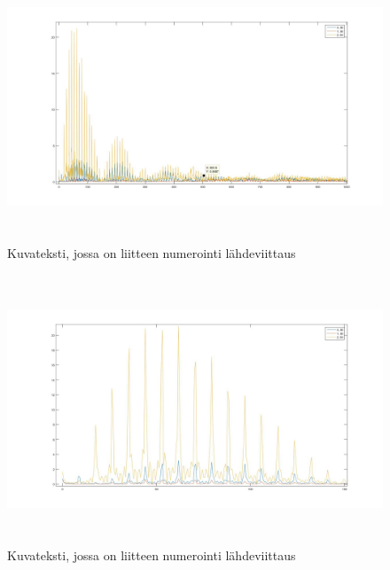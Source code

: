 \begin{figure}[htb]
\begin{center}
\includegraphics[height=8cm]{images/FFT-80}
\end{center}
\caption{Kuvateksti, jossa on liitteen numerointi {\color{red}l\"ahdeviittaus}}
\label{liitekuva}
\end{figure}

\begin{figure}[htb]
\begin{center}
\includegraphics[height=8cm]{images/FFT-80-zoom}
\end{center}
\caption{Kuvateksti, jossa on liitteen numerointi {\color{red}l\"ahdeviittaus}}
\label{liitekuva}
\end{figure}
